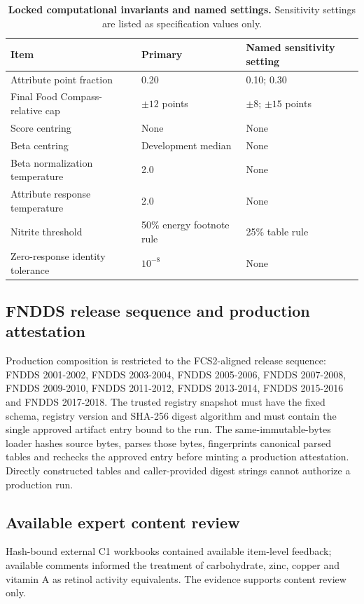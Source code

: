 \begin{table}[t]
\caption{\textbf{Locked computational invariants and named settings.}
Sensitivity settings are listed as specification values only.}
\label{tab:supp_method_invariants}
\centering
\begin{tabular}{p{} p{} p{}}
\toprule
Item & Primary & Named sensitivity setting \\
\midrule
Attribute point fraction & 0.20 & 0.10; 0.30 \\
Final Food Compass-relative cap & \(\pm 12\) points & \(\pm 8\); \(\pm 15\) points \\
Score centring & None & None \\
Beta centring & Development median & None \\
Beta normalization temperature & 2.0 & None \\
Attribute response temperature & 2.0 & None \\
Nitrite threshold & 50\% energy footnote rule & 25\% table rule \\
Zero-response identity tolerance & \(10^{-8}\) & None \\
\bottomrule
\end{tabular}
\end{table}

\subsection*{FNDDS release sequence and production attestation}

Production composition is restricted to the FCS2-aligned release sequence:
FNDDS 2001-2002, FNDDS 2003-2004, FNDDS 2005-2006, FNDDS 2007-2008, FNDDS
2009-2010, FNDDS 2011-2012, FNDDS 2013-2014, FNDDS 2015-2016 and FNDDS
2017-2018. The trusted registry snapshot must have the fixed schema, registry
version and SHA-256 digest algorithm and must contain the single approved
artifact entry bound to the run. The same-immutable-bytes loader hashes source
bytes, parses those bytes, fingerprints canonical parsed tables and rechecks
the approved entry before minting a production attestation. Directly constructed
tables and caller-provided digest strings cannot authorize a production run.

\subsection*{Available expert content review}

Hash-bound external C1 workbooks contained available item-level feedback;
available comments informed the treatment of carbohydrate, zinc, copper and
vitamin A as retinol activity equivalents. The evidence supports content review
only.

